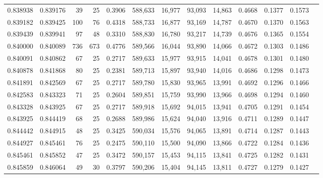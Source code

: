\begin{tabular}{rrrrrrrrrrrrr}
0.838938 & 0.839176 &    39 &  25 &                                     0.3906 & 588,633 &  16,977 &  93,093 &  14,863 & 0.4668 & 0.1377 & 0.1573 \\
0.839182 & 0.839425 &   100 &  76 &                                     0.4318 & 588,733 &  16,877 &  93,169 &  14,787 & 0.4670 & 0.1370 & 0.1563 \\
0.839439 & 0.839941 &    97 &  48 &                                     0.3310 & 588,830 &  16,780 &  93,217 &  14,739 & 0.4676 & 0.1365 & 0.1554 \\
0.840000 & 0.840089 &   736 & 673 &                                     0.4776 & 589,566 &  16,044 &  93,890 &  14,066 & 0.4672 & 0.1303 & 0.1486 \\
0.840091 & 0.840862 &    67 &  25 &                                     0.2717 & 589,633 &  15,977 &  93,915 &  14,041 & 0.4678 & 0.1301 & 0.1480 \\
0.840878 & 0.841868 &    80 &  25 &                                     0.2381 & 589,713 &  15,897 &  93,940 &  14,016 & 0.4686 & 0.1298 & 0.1473 \\
0.841891 & 0.842569 &    67 &  25 &                                     0.2717 & 589,780 &  15,830 &  93,965 &  13,991 & 0.4692 & 0.1296 & 0.1466 \\
0.842583 & 0.843323 &    71 &  25 &                                     0.2604 & 589,851 &  15,759 &  93,990 &  13,966 & 0.4698 & 0.1294 & 0.1460 \\
0.843328 & 0.843925 &    67 &  25 &                                     0.2717 & 589,918 &  15,692 &  94,015 &  13,941 & 0.4705 & 0.1291 & 0.1454 \\
0.843925 & 0.844419 &    68 &  25 &                                     0.2688 & 589,986 &  15,624 &  94,040 &  13,916 & 0.4711 & 0.1289 & 0.1447 \\
0.844442 & 0.844915 &    48 &  25 &                                     0.3425 & 590,034 &  15,576 &  94,065 &  13,891 & 0.4714 & 0.1287 & 0.1443 \\
0.844927 & 0.845461 &    76 &  25 &                                     0.2475 & 590,110 &  15,500 &  94,090 &  13,866 & 0.4722 & 0.1284 & 0.1436 \\
0.845461 & 0.845852 &    47 &  25 &                                     0.3472 & 590,157 &  15,453 &  94,115 &  13,841 & 0.4725 & 0.1282 & 0.1431 \\
0.845859 & 0.846064 &    49 &  30 &                                     0.3797 & 590,206 &  15,404 &  94,145 &  13,811 & 0.4727 & 0.1279 & 0.1427 \\

\end{tabular}
